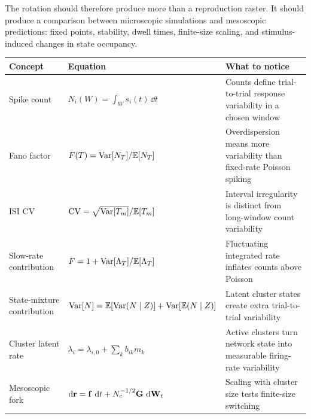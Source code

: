The rotation should therefore produce more than a reproduction raster. It should produce a comparison between microscopic simulations and mesoscopic predictions: fixed points, stability, dwell times, finite-size scaling, and stimulus-induced changes in state occupancy.

\begin{chaptersummary}

\begin{center}
\renewcommand{\arraystretch}{1.55}
\begin{tabularx}{\textwidth}{@{}l X X@{}}
  \toprule
  \textbf{Concept} & \textbf{Equation} & \textbf{What to notice} \\
  \midrule
  Spike count &
  $N_i(W)=\int_W s_i(t)\,\dd t$ &
  Counts define trial-to-trial response variability in a chosen window \\
  Fano factor &
  $F(T)=\operatorname{Var}[N_T]/\mathbb{E}[N_T]$ &
  Overdispersion means more variability than fixed-rate Poisson spiking \\
  ISI CV &
  $\mathrm{CV}=\sqrt{\operatorname{Var}[T_m]}/\mathbb{E}[T_m]$ &
  Interval irregularity is distinct from long-window count variability \\
  Slow-rate contribution &
  $F=1+\operatorname{Var}[\Lambda_T]/\mathbb{E}[\Lambda_T]$ &
  Fluctuating integrated rate inflates counts above Poisson \\
  State-mixture contribution &
  $\operatorname{Var}[N]=\mathbb{E}[\operatorname{Var}(N\mid Z)]+\operatorname{Var}[\mathbb{E}(N\mid Z)]$ &
  Latent cluster states create extra trial-to-trial variability \\
  Cluster latent rate &
  $\lambda_i=\lambda_{i,0}+\sum_k b_{ik}m_k$ &
  Active clusters turn network state into measurable firing-rate variability \\
  Mesoscopic fork &
  $\mathop{}\!\mathrm{d}\mathbf{r}=\mathbf{f}\,\mathop{}\!\mathrm{d} t+N_c^{-1/2}\mathbf{G}\,\mathop{}\!\mathrm{d}\mathbf{W}_t$ &
  Scaling with cluster size tests finite-size switching \\
  \bottomrule
\end{tabularx}
\end{center}

\end{chaptersummary}

